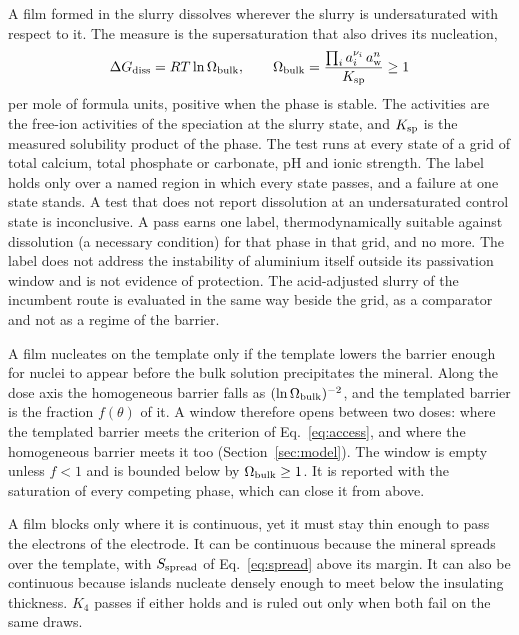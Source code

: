 A film formed in the slurry dissolves wherever the slurry is undersaturated with respect to it. %
The measure is the supersaturation that also drives its nucleation, %
\begin{equation}\label{eq:stability}
\Delta G_\mathrm{diss}=R T\ln\Omega_\mathrm{bulk},\qquad \Omega_\mathrm{bulk}=\frac{\prod_i a_i^{\nu_i}\,a_\mathrm{w}^{n}}{K_\mathrm{sp}}\ge1
\end{equation}
per mole of formula units, positive when the phase is stable. %
The activities are the free-ion activities of the speciation at the slurry state, and $K_\mathrm{sp}$ is the measured solubility product of the phase. %
The test runs at every state of a grid of total calcium, total phosphate or carbonate, pH and ionic strength. %
The label holds only over a named region in which every state passes, and a failure at one state stands. %
A test that does not report dissolution at an undersaturated control state is inconclusive. %
A pass earns one label, thermodynamically suitable against dissolution (a necessary condition) for that phase in that grid, and no more. %
The label does not address the instability of aluminium itself outside its passivation window and is not evidence of protection. %
The acid-adjusted slurry of the incumbent route is evaluated in the same way beside the grid, as a comparator and not as a regime of the barrier. %

A film nucleates on the template only if the template lowers the barrier enough for nuclei to appear before the bulk solution precipitates the mineral. %
Along the dose axis the homogeneous barrier falls as $(\ln\Omega_\mathrm{bulk})^{-2}$, and the templated barrier is the fraction $f(\theta)$ of it. %
A window therefore opens between two doses: where the templated barrier meets the criterion of Eq.~\eqref{eq:access}, and where the homogeneous barrier meets it too (Section~\ref{sec:model}). %
The window is empty unless $f<1$ and is bounded below by $\Omega_\mathrm{bulk}\ge1$. %
It is reported with the saturation of every competing phase, which can close it from above. %

A film blocks only where it is continuous, yet it must stay thin enough to pass the electrons of the electrode. %
It can be continuous because the mineral spreads over the template, with $S_\mathrm{spread}$ of Eq.~\eqref{eq:spread} above its margin. %
It can also be continuous because islands nucleate densely enough to meet below the insulating thickness. %
$K_4$ passes if either holds and is ruled out only when both fail on the same draws. %

